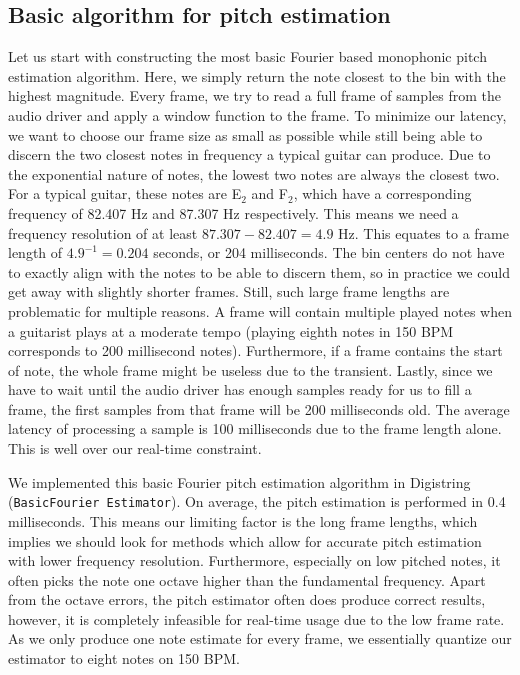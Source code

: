 \documentclass[10pt,twocolumn]{article}
\newcommand{\note}[2]{#1${}_{#2}$}
\begin{document}
\subsection{Basic algorithm for pitch estimation}
Let us start with constructing the most basic Fourier based monophonic pitch estimation algorithm. Here, we simply return the note closest to the bin with the highest magnitude. Every frame, we try to read a full frame of samples from the audio driver and apply a window function to the frame. To minimize our latency, we want to choose our frame size as small as possible while still being able to discern the two closest notes in frequency a typical guitar can produce. Due to the exponential nature of notes, the lowest two notes are always the closest two. For a typical guitar, these notes are \note{E}{2} and \note{F}{2}, which have a corresponding frequency of 82.407 Hz and 87.307 Hz respectively. This means we need a frequency resolution of at least $87.307 - 82.407 = 4.9$ Hz. This equates to a frame length of $4.9^{-1} = 0.204$ seconds, or 204 milliseconds. The bin centers do not have to exactly align with the notes to be able to discern them, so in practice we could get away with slightly shorter frames. Still, such large frame lengths are problematic for multiple reasons. A frame will contain multiple played notes when a guitarist plays at a moderate tempo (playing eighth notes in 150 BPM corresponds to 200 millisecond notes). Furthermore, if a frame contains the start of note, the whole frame might be useless due to the transient. Lastly, since we have to wait until the audio driver has enough samples ready for us to fill a frame, the first samples from that frame will be 200 milliseconds old. The average latency of processing a sample is 100 milliseconds due to the frame length alone. This is well over our real-time constraint.

We implemented this basic Fourier pitch estimation algorithm in Digistring (\texttt{BasicFourier Estimator}). On average, the pitch estimation is performed in 0.4 milliseconds. This means our limiting factor is the long frame lengths, which implies we should look for methods which allow for accurate pitch estimation with lower frequency resolution. Furthermore, especially on low pitched notes, it often picks the note one octave higher than the fundamental frequency. Apart from the octave errors, the pitch estimator often does produce correct results, however, it is completely infeasible for real-time usage due to the low frame rate. As we only produce one note estimate for every frame, we essentially quantize our estimator to eight notes on 150 BPM.
\end{document}
